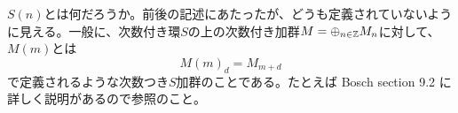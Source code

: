 \begin{rem}
  $S(n)$とは何だろうか。前後の記述にあたったが、どうも定義されていないように見える。一般に、次数付き環$S$の上の次数付き加群$M = \oplus_{n \in {\mathbb Z}} M_n$に対して、$M(m)$とは
  \[
  M(m)_d = M_{m+d}
  \]
  で定義されるような次数つき$S$加群のことである。たとえば Bosch\cite{Bosch} section 9.2 に詳しく説明があるので参照のこと。
\end{rem}
